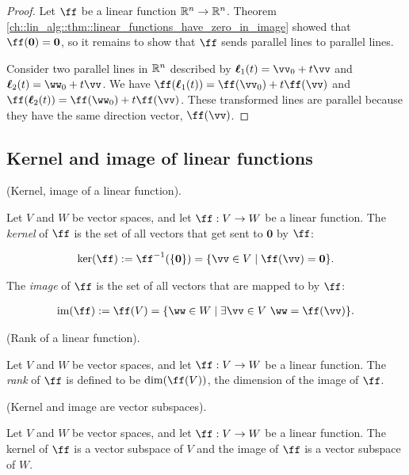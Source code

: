 \begin{proof}
   Let $\ff$ be a linear function $\mathbb{R}^n \rightarrow \mathbb{R}^n$. Theorem \ref{ch::lin_alg::thm::linear_functions_have_zero_in_image} showed that $\ff(\mathbf{0}) = \mathbf{0}$, so it remains to show that $\ff$ sends parallel lines to parallel lines. 
   
   Consider two parallel lines in $\mathbb{R}^n$ described by $\eell_1(t) = \vv_0 + t\vv$ and $\eell_2(t) = \ww_0 + t\vv$. We have $\ff(\eell_1(t)) = \ff(\vv_0) + t \ff(\vv)$ and $\ff(\eell_2(t)) = \ff(\ww_0) + t \ff(\vv)$. These transformed lines are parallel because they have the same direction vector, $\ff(\vv)$.
\end{proof}

\newpage

\subsection*{Kernel and image of linear functions}

\begin{defn}
    (Kernel, image of a linear function).
    
    Let $V$ and $W$ be vector spaces, and let $\ff:V \rightarrow W$ be a linear function. The \textit{kernel} of $\ff$ is the set of all vectors that get sent to $\mathbf{0}$ by $\ff$:
    
    \begin{align*}
        \ker(\ff) := \ff^{-1}(\{\mathbf{0}\}) = \{ \vv \in V \mid \ff(\vv) = \mathbf{0} \}.
    \end{align*}
    
    The \textit{image} of $\ff$ is the set of all vectors that are mapped to by $\ff$:
    
    \begin{align*}
        \im(\ff) := \ff(V) = \{ \ww \in W \mid \exists \vv \in V \spc \ww = \ff(\vv) \}.
    \end{align*}
\end{defn}

\begin{defn}
\label{ch::lin_alg::defn::rank}
    (Rank of a linear function). 
    
    Let $V$ and $W$ be vector spaces, and let $\ff:V \rightarrow W$ be a linear function. The \textit{rank} of $\ff$ is defined to be $\dim(\ff(V))$, the dimension of the image of $\ff$.
\end{defn}

\begin{theorem}
    (Kernel and image are vector subspaces). 
    
    Let $V$ and $W$ be vector spaces, and let $\ff:V \rightarrow W$ be a linear function. The kernel of $\ff$ is a vector subspace of $V$ and the image of $\ff$ is a vector subspace of $W$.
\end{theorem}


